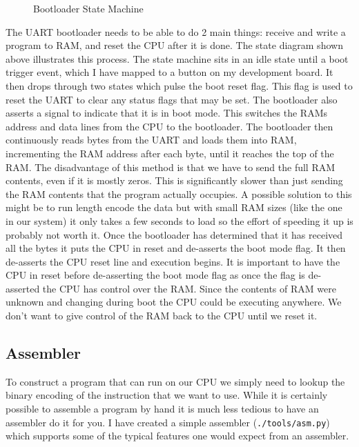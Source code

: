 \documentclass[10pt]{article}
\begin{document}
\begin{figure}[H]
\begin{minipage}[t]{.4\textwidth}
                \caption{Bootloader State Machine}
            \end{minipage}
        \end{figure}

        The UART bootloader needs to be able to do 2 main things: receive and
        write a program to RAM, and reset the CPU after it is done. The state
        diagram shown above illustrates this process. The state machine sits in
        an idle state until a boot trigger event, which I have mapped to a
        button on my development board. It then drops through two states which
        pulse the boot reset flag. This flag is used to reset the UART to clear
        any status flags that may be set. The bootloader also asserts a signal
        to indicate that it is in boot mode. This switches the RAMs address and
        data lines from the CPU to the bootloader. The bootloader then
        continuously reads bytes from the UART and loads them into RAM,
        incrementing the RAM address after each byte, until it reaches the top
        of the RAM. The disadvantage of this method is that we have to send the
        full RAM contents, even if it is mostly zeros. This is significantly
        slower than just sending the RAM contents that the program actually
        occupies.  A possible solution to this might be to run length encode
        the data but with small RAM sizes (like the one in our system) it only
        takes a few seconds to load so the effort of speeding it up is probably
        not worth it. Once the bootloader has determined that it has received
        all the bytes it puts the CPU in reset and de-asserts the boot mode
        flag. It then de-asserts the CPU reset line and execution begins. It is
        important to have the CPU in reset before de-asserting the boot mode
        flag as once the flag is de-asserted the CPU has control over the RAM.
        Since the contents of RAM were unknown and changing during boot the CPU
        could be executing anywhere. We don't want to give control of the RAM
        back to the CPU until we reset it.


    \newpage
    \subsection{Assembler}

    To construct a program that can run on our CPU we simply need to lookup the
    binary encoding of the instruction that we want to use. While it is
    certainly possible to assemble a program by hand it is much less tedious to
    have an assembler do it for you. I have created a simple assembler
    (\texttt{./tools/asm.py}) which supports some of the typical features one
    would expect from an assembler.
\end{document}
